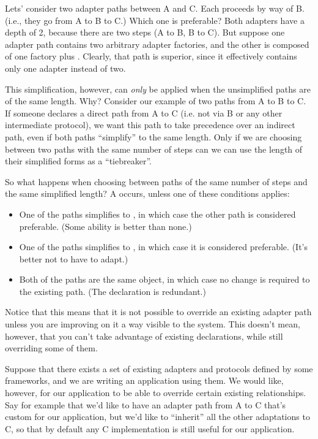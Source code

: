 \begin{verbatim%
}
\begin{verbatim%
}
\begin{verbatim%
}
\begin{verbatim%
}
\begin{verbatim%
}
\begin{verbatim%
}
Lets' consider two adapter paths between A and C.  Each proceeds by way of B.
(i.e., they go from A to B to C.)  Which one is preferable?  Both
adapters have a depth of 2, because there are two steps (A to B, B to C).  But
suppose one adapter path contains two arbitrary adapter factories, and the
other is composed of one factory plus .  Clearly,
that path is superior, since it effectively contains only one adapter instead
of two.

This simplification, however, can \emph{only} be applied when the unsimplified
paths are of the same length.  Why?  Consider our example of two paths from A
to B to C.  If someone declares a direct path from A to C (i.e. not via B or
any other intermediate protocol), we want this path to take precedence over an
indirect path, even if both paths ``simplify'' to the same length.  Only if we
are choosing between two paths with the same number of steps can we can use the
length of their simplified forms as a ``tiebreaker''.

So what happens when choosing between paths of the same number of steps and the
same simplified length?  A  occurs, unless one of these
conditions applies:

\begin{itemize}
\item One of the paths simplifies to , in which case
the other path is considered preferable.  (Some ability is better than none.)

\item One of the paths simplifies to , in which
case it is considered preferable.  (It's better not to have to adapt.)

\item Both of the paths are the same object, in which case no change is
required to the existing path.  (The declaration is redundant.)
\end{itemize}

Notice that this means that it is not possible to override an existing adapter
path unless you are improving on it a way visible to the system.  This doesn't
mean, however, that you can't take advantage of existing declarations, while
still overriding some of them.

Suppose that there exists a set of existing adapters and protocols defined by
some frameworks, and we are writing an application using them.  We would like,
however, for our application to be able to override certain existing
relationships.  Say for example that we'd like to have an adapter path from A
to C that's custom for our application, but we'd like to ``inherit'' all the
other adaptations to C, so that by default any C implementation is still useful
for our application.


\end{verbatim%
}
\end{verbatim%
}
\end{verbatim%
}
\end{verbatim%
}
\end{verbatim%
}
\end{verbatim%
}
